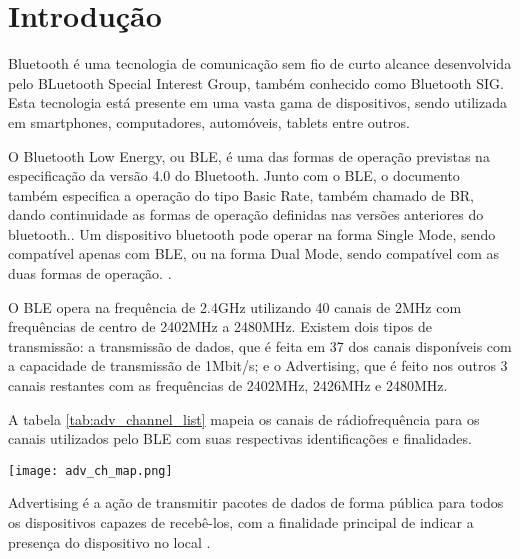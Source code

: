 \section{Introdução}

Bluetooth é uma tecnologia de comunicação sem fio de curto alcance desenvolvida
pelo BLuetooth Special Interest Group, também conhecido como Bluetooth SIG. Esta
tecnologia está presente em uma vasta gama de dispositivos, sendo utilizada em
smartphones, computadores, automóveis, tablets entre
outros\cite{gomez2012overview}.

O Bluetooth Low Energy, ou BLE, é uma das formas de operação previstas na
especificação da versão 4.0 do Bluetooth. Junto com o BLE, o documento também
especifica a operação do tipo Basic Rate, também chamado de BR, dando
continuidade as formas de operação definidas nas versões anteriores do bluetooth.\cite{ble4core}.
Um dispositivo bluetooth pode operar na forma Single Mode, sendo compatível
apenas com BLE, ou na forma Dual Mode, sendo compatível com as duas
formas de operação. \cite{ble4core}.


O BLE opera na frequência de 2.4GHz utilizando 40 canais de 2MHz com
frequências de centro de 2402MHz a 2480MHz. Existem dois tipos de transmissão: a
transmissão de dados, que é feita em 37 dos canais disponíveis com a capacidade
de transmissão de 1Mbit/s; e o Advertising, que é feito nos outros 3 canais
restantes com as frequências de 2402MHz, 2426MHz e 2480MHz.\cite{ble4core}

A tabela \ref{tab:adv_channel_list} mapeia os canais de rádiofrequência para os canais
utilizados pelo BLE com suas respectivas identificações e finalidades.

\begin{center}
	\centering 
	\texttt{[image: adv\_ch\_map.png]}
	\label{tab:adv_channel_list}
\end{center} 
 
Advertising é a ação de transmitir pacotes de dados de forma pública para todos
os dispositivos capazes de recebê-los, com a finalidade principal de indicar a
presença do dispositivo no local \cite{ble4core}.

% 
% 
% 

